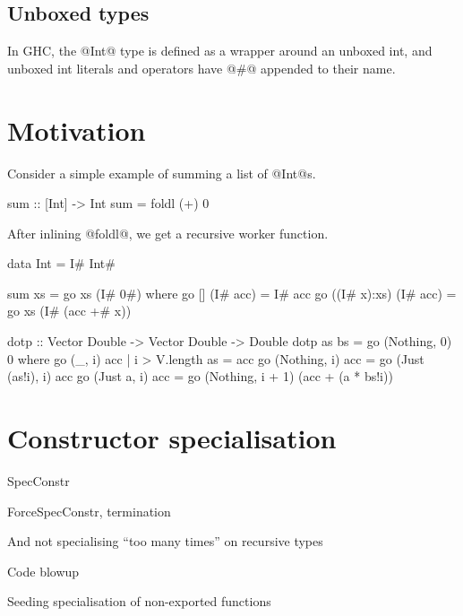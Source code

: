 \documentclass{tmr}
\begin{document}
\subsection{Unboxed types}
In GHC, the @Int@ type is defined as a wrapper around an unboxed int,
and unboxed int literals and operators have @#@ appended to their name.


\section{Motivation}
Consider a simple example of summing a list of @Int@s.
\begin{code}
sum :: [Int] -> Int
sum = foldl (+) 0
\end{code}

After inlining @foldl@, we get a recursive worker function.
\begin{code}
data Int = I# Int#

sum xs = go xs (I# 0#)
 where
  go []          (I# acc) = I# acc
  go ((I# x):xs) (I# acc) = go xs (I# (acc +# x))
\end{code}



\begin{code}
dotp :: Vector Double -> Vector Double -> Double
dotp as bs = go (Nothing, 0) 0
 where
  go (_, i) acc
   | i > V.length as
   = acc
  go (Nothing, i) acc
   = go (Just (as!i), i) acc
  go (Just a, i) acc
   = go (Nothing, i + 1) (acc + (a * bs!i))
\end{code}

\section{Constructor specialisation}

SpecConstr

ForceSpecConstr, termination

And not specialising ``too many times'' on recursive types

Code blowup

Seeding specialisation of non-exported functions
\end{document}
